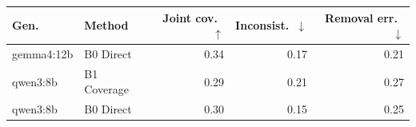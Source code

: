 \begin{tabular}{llrrr}
\toprule
Gen. & Method & Joint cov.\ $\uparrow$ & Inconsist.\ $\downarrow$ & Removal err.\ $\downarrow$ \\
\midrule
gemma4:12b & B0 Direct & 0.34 & 0.17 & 0.21 \\
qwen3:8b & B1 Coverage & 0.29 & 0.21 & 0.27 \\
qwen3:8b & B0 Direct & 0.30 & 0.15 & 0.25 \\
\bottomrule
\end{tabular}